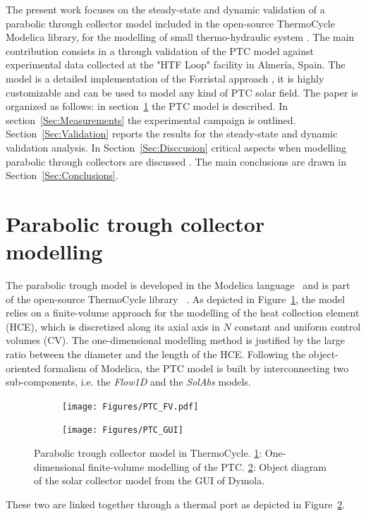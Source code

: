 \documentclass[final,3p,times,review]{elsarticle}
\begin{document}
The present work focuses on the steady-state and dynamic validation of a parabolic through collector model included in the open-source ThermoCycle Modelica library, for the modelling of small thermo-hydraulic system \cite{Quoilin2014a}. The main contribution consists in a through validation of the PTC model against experimental data collected at the "HTF Loop" facility in Almer\'ia, Spain. 
The model is a detailed implementation of the Forristal approach \citep{Forristal2003}, it is highly customizable and can be used to model any kind of PTC solar field.
The paper is organized as follows: in section~\ref{Sec:DynModel} the PTC model is described. In section~\ref{Sec:Measurements} the experimental campaign is outlined. Section~\ref{Sec:Validation} reports the results for the steady-state and dynamic validation analysis. In Section~\ref{Sec:Disccusion} critical aspects when modelling parabolic through collectors are discussed .  The main conclusions are drawn in Section~\ref{Sec:Conclusions}.
%
\section{Parabolic trough collector modelling}
\label{Sec:DynModel}

The parabolic trough model is developed in the Modelica language~\cite{Elmqvist1978} and is part of the open-source ThermoCycle library ~\cite{Quoilin2014a}. As depicted in Figure~\ref{fig:PTC_FV}, the model relies on a finite-volume approach for the modelling of the heat collection element (HCE), which is discretized along its axial axis in $N$ constant and uniform control volumes (CV). The one-dimensional modelling method is justified by the large ratio between the diameter and the length of the HCE. Following the object-oriented formalism of Modelica, the PTC model is built by interconnecting two sub-components, i.e. the \textit{Flow1D} and the \textit{SolAbs} models. 
%
\begin{figure}[h!]
	\centering
	\begin{subfigure}[b]{0.48\textwidth}
		\centering
		\texttt{[image: Figures/PTC\_FV.pdf]}
		\caption{}
		\label{fig:PTC_FV}	
	\end{subfigure}
	\begin{subfigure}[b]{0.48\textwidth}
		\centering
		\texttt{[image: Figures/PTC\_GUI]}
		\caption{}
		\label{fig:PTC_GUI}
	\end{subfigure}
	\caption{Parabolic trough collector model in ThermoCycle. \ref{fig:PTC_FV}: One-dimensional finite-volume modelling of the PTC. \ref{fig:PTC_GUI}: Object diagram of the solar collector model from the GUI of Dymola.}
	\label{fig:PTC_model}
\end{figure}
%
These two are linked together through a thermal port as depicted in Figure~\ref{fig:PTC_GUI}.
\end{document}
